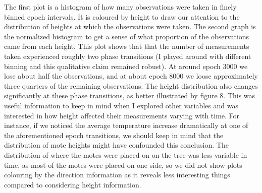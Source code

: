 \documentclass[english]{article}\usepackage[]{graphicx}\usepackage[]{color}
\begin{document}
The first plot is a histogram of how many observations were taken in finely binned epoch intervals.  It is coloured by height to draw our attention to the distribution of heights at which the observations were taken.  The second graph is the normalized histogram to get a sense of what proportion of the observations came from each height.  This plot shows that that the number of measurements taken experienced roughly two phase transitions (I played around with different binning and this qualitative claim remained robust).  At around epoch 3000 we lose about half the observations, and at about epoch 8000 we loose approximately three quarters of the remaining observations. The height distribution also changes significantly at these phase transitions, as better illustrated by figure 8.  This was useful information to keep in mind when I explored other variables and was interested in how height affected their measurements varying with time. For instance,  if we noticed the average temperature increase dramatically at one of the aforementioned epoch transitions, we should keep in mind that the distribution of mote heights might have confounded this conclusion.  The distribution of where the motes were placed on on the tree was less variable in time, as most of the motes were placed on one side, so we did not show plots colouring by the direction information as it reveals less interesting things compared to considering height information.  \\    
\end{document}
